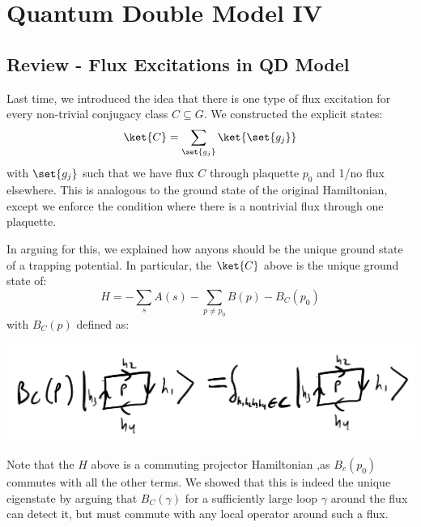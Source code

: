 \section{Quantum Double Model IV}

\subsection{Review - Flux Excitations in QD Model}
Last time, we introduced the idea that there is one type of flux excitation for every non-trivial conjugacy class $C \subseteq G$. We constructed the explicit states:
\begin{equation}
    \ket{C} = \sum_{\set{g_j}}\ket{\set{g_j}}
\end{equation}
with $\set{g_j}$ such that we have flux $C$ through plaquette $p_0$ and 1/no flux elsewhere. This is analogous to the ground state of the original Hamiltonian, except we enforce the condition where there is a nontrivial flux through one plaquette.

In arguing for this, we explained how anyons should be the unique ground state of a trapping potential. In particular, the $\ket{C}$ above is the unique ground state of:
\begin{equation}
    H = -\sum_s A(s) - \sum_{p\neq p_0}B(p) - B_C(p_0)
\end{equation}
with $B_C(p)$ defined as:
\begin{center}
    \includegraphics[scale=0.35]{Lectures/Images/lec8-Bcp.png}
\end{center}
Note that the $H$ above is a commuting projector Hamiltonian ,as $B_c(p_0)$ commutes with all the other terms. We showed that this is indeed the unique eigenstate by arguing that $B_C(\gamma)$ for a sufficiently large loop $\gamma$ around the flux can detect it, but must commute with any local operator around such a flux.

